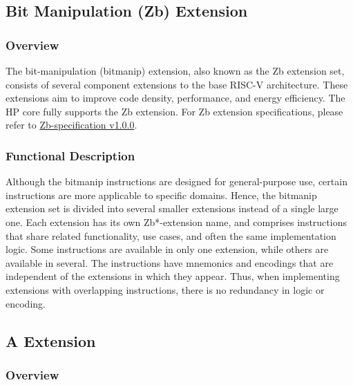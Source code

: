 \documentclass[main\_\_EN.tex]{subfiles}
\begin{document}

\newpage
\subsection{Bit Manipulation (Zb) Extension}
\label{sec:riscvcpu-zb}

\subsubsection{Overview}
\label{sec:riscvcpu-zb-overview}

The bit-manipulation (bitmanip) extension, also known as the Zb extension set, consists of several component extensions to the base RISC-V architecture. These extensions aim to improve code density, performance, and energy efficiency. The HP core fully supports the Zb extension. For Zb extension specifications, please refer to \href{https://github.com/riscv/riscv-b}{Zb-specification v1.0.0}.

\subsubsection{Functional Description}
\label{sec:riscvcpu-zb-func-descr}

Although the bitmanip instructions are designed for general-purpose use, certain instructions are more applicable to specific domains. Hence, the bitmanip extension set is divided into several smaller extensions instead of a single large one. Each extension has its own Zb*-extension name, and comprises instructions that share related functionality, use cases, and often the same implementation logic. Some instructions are available in only one extension, while others are available in several. The instructions have mnemonics and encodings that are independent of the extensions in which they appear. Thus, when implementing extensions with overlapping instructions, there is no redundancy in logic or encoding.

\newpage


\newpage
\subsection{A Extension}
\label{sec:riscvcpu-atomic}

\subsubsection{Overview}
\label{sec:riscvcpu-atomic-overview}
\end{document}

